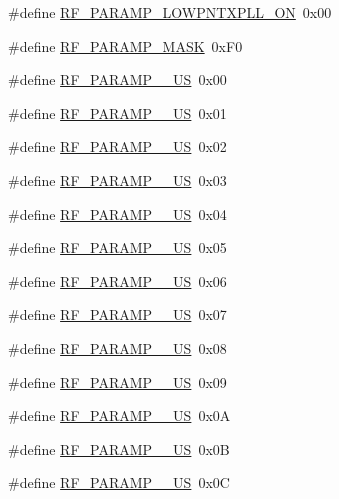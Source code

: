 \begin{DoxyCompactItemize}
\#define \hyperlink{sx1276Regs-Fsk_8h_ab08c5cb0f135bcc77cb0d238467ce7b6}{R\+F\+\_\+\+P\+A\+R\+A\+M\+P\+\_\+\+L\+O\+W\+P\+N\+T\+X\+P\+L\+L\+\_\+\+ON}~0x00
\item 
\#define \hyperlink{sx1276Regs-Fsk_8h_acf298b5a57b53f2dbaabc1bf14b7e195}{R\+F\+\_\+\+P\+A\+R\+A\+M\+P\+\_\+\+M\+A\+SK}~0x\+F0
\item 
\#define \hyperlink{sx1276Regs-Fsk_8h_a7af19d4ba1da0302a8f0663928b03fb3}{R\+F\+\_\+\+P\+A\+R\+A\+M\+P\+\_\+\_\+\+US}~0x00
\item 
\#define \hyperlink{sx1276Regs-Fsk_8h_a19914e4184e2246e820f923f068b4a84}{R\+F\+\_\+\+P\+A\+R\+A\+M\+P\+\_\+\_\+\+US}~0x01
\item 
\#define \hyperlink{sx1276Regs-Fsk_8h_a8647a6bde6d158ce8a6209f0bcf939a5}{R\+F\+\_\+\+P\+A\+R\+A\+M\+P\+\_\+\_\+\+US}~0x02
\item 
\#define \hyperlink{sx1276Regs-Fsk_8h_a2b7aa0506166758344a48149bc647a19}{R\+F\+\_\+\+P\+A\+R\+A\+M\+P\+\_\+\_\+\+US}~0x03
\item 
\#define \hyperlink{sx1276Regs-Fsk_8h_ac09b8ab8fd2f894cff3f4ff744fc6afe}{R\+F\+\_\+\+P\+A\+R\+A\+M\+P\+\_\+\_\+\+US}~0x04
\item 
\#define \hyperlink{sx1276Regs-Fsk_8h_a503450550b5adc6b1a90f669560ce6e3}{R\+F\+\_\+\+P\+A\+R\+A\+M\+P\+\_\+\_\+\+US}~0x05
\item 
\#define \hyperlink{sx1276Regs-Fsk_8h_ab6436b7008237e768430e4341f3690c2}{R\+F\+\_\+\+P\+A\+R\+A\+M\+P\+\_\+\_\+\+US}~0x06
\item 
\#define \hyperlink{sx1276Regs-Fsk_8h_afdbd878cf8d71fc7847839ede51befcf}{R\+F\+\_\+\+P\+A\+R\+A\+M\+P\+\_\+\_\+\+US}~0x07
\item 
\#define \hyperlink{sx1276Regs-Fsk_8h_ac822b78122be23759c44a0ea4bafcee8}{R\+F\+\_\+\+P\+A\+R\+A\+M\+P\+\_\+\_\+\+US}~0x08
\item 
\#define \hyperlink{sx1276Regs-Fsk_8h_a8bf30d2871eb23126fcf129bc33e865d}{R\+F\+\_\+\+P\+A\+R\+A\+M\+P\+\_\+\_\+\+US}~0x09
\item 
\#define \hyperlink{sx1276Regs-Fsk_8h_ac52043271b89e70323e72d1075f0b6fe}{R\+F\+\_\+\+P\+A\+R\+A\+M\+P\+\_\+\_\+\+US}~0x0A
\item 
\#define \hyperlink{sx1276Regs-Fsk_8h_ad0dfe13e76f88d7ded3c3ef508d4d2ae}{R\+F\+\_\+\+P\+A\+R\+A\+M\+P\+\_\+\_\+\+US}~0x0B
\item 
\#define \hyperlink{sx1276Regs-Fsk_8h_a321fde6a82d665cb174086f7d532eff8}{R\+F\+\_\+\+P\+A\+R\+A\+M\+P\+\_\+\_\+\+US}~0x0C

\end{DoxyCompactItemize}
